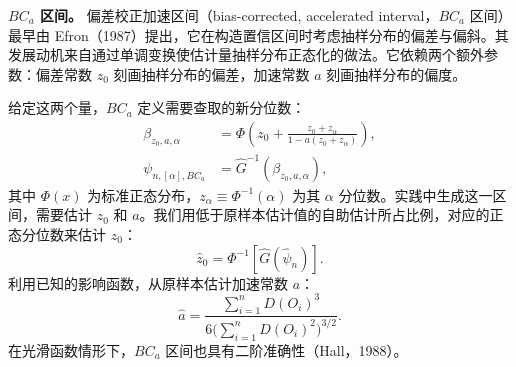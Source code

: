 \noindent\textbf{$BC_a$ 区间。}\enspace
偏差校正加速区间（bias-corrected, accelerated interval，$BC_a$ 区间）最早由 Efron（1987）提出，它在构造置信区间时考虑抽样分布的偏差与偏斜。其发展动机来自通过单调变换使估计量抽样分布正态化的做法。它依赖两个额外参数：偏差常数 $z_0$ 刻画抽样分布的偏差，加速常数 $a$ 刻画抽样分布的偏度。

给定这两个量，$BC_a$ 定义需要查取的新分位数：
\[
\begin{aligned}
 \beta_{z_0,a,\alpha}
 &=\Phi\left(z_0+\frac{z_0+z_\alpha}{1-a(z_0+z_\alpha)}\right),\\
 \psi_{n,[\alpha],BC_a}&=\hat G^{-1}(\beta_{z_0,a,\alpha}),
\end{aligned}
\]
其中 $\Phi(x)$ 为标准正态分布，$z_\alpha\equiv\Phi^{-1}(\alpha)$ 为其 $\alpha$ 分位数。实践中生成这一区间，需要估计 $z_0$ 和 $a$。我们用低于原样本估计值的自助估计所占比例，对应的正态分位数来估计 $z_0$：
\[
 \hat z_0=\Phi^{-1}[\hat G(\hat\psi_n)].
\]
利用已知的影响函数，从原样本估计加速常数 $a$：
\[
 \hat a=\frac{\sum_{i=1}^nD(O_i)^3}
 {6\bigl(\sum_{i=1}^nD(O_i)^2\bigr)^{3/2}}.
\]
在光滑函数情形下，$BC_a$ 区间也具有二阶准确性（Hall，1988）。
